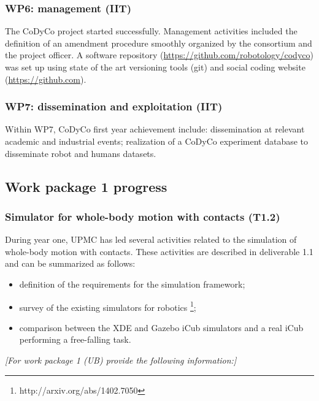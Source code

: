 \documentclass[12pt,a4paper,twoside]{article}
\begin{document}
\subsubsection{WP6: management (IIT)}

The CoDyCo project started successfully. Management activities included the definition of an amendment procedure smoothly organized by the consortium and the project officer. A software repository (\url{https://github.com/robotology/codyco}) was set up using state of the art versioning tools (git) and social coding website (\url{https://github.com}). 

\subsubsection{WP7: dissemination and exploitation (IIT)}

Within WP7, CoDyCo first year achievement include: dissemination at relevant academic and industrial events; realization of a CoDyCo experiment database to disseminate robot and humans datasets. 

\subsection{Work package 1 progress}

\subsubsection{Simulator for whole-body motion with contacts (T1.2)}

During year one, UPMC has led several activities related to the simulation of whole-body motion with contacts. These activities are described in deliverable 1.1 and can be summarized as follows:
\begin{itemize}
	\item definition of the requirements for the simulation framework;
	\item survey of the existing simulators for robotics \footnote{http://arxiv.org/abs/1402.7050};
	\item comparison between the XDE and Gazebo iCub simulators and a real iCub performing a free-falling task.
\end{itemize}

\emph{\color{red}[For work package 1 (UB) provide the following information:]}
\end{document}
